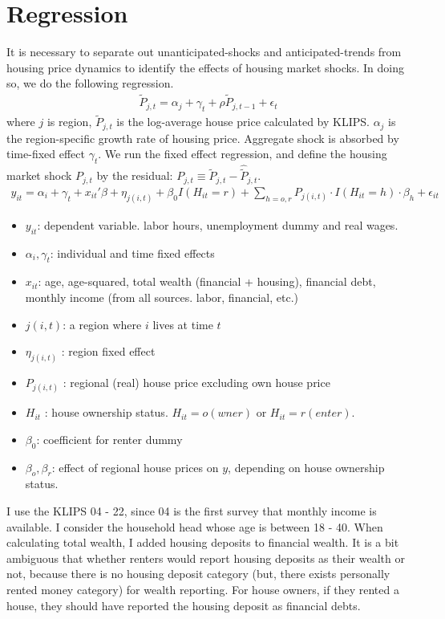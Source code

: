 \documentclass[12pt,letterpaper]{article}
\begin{document}
\section{Regression}
It is necessary to separate out unanticipated-shocks and anticipated-trends from housing price dynamics to identify the effects of housing market shocks. In doing so, we do the following regression.
\begin{eqnarray}
\tilde P_{j,t} = \alpha_j + \gamma_t + \rho \tilde P_{j,t-1} + \epsilon_t
\end{eqnarray}
where $j$ is region, $\tilde P_{j,t}$ is the log-average house price calculated by KLIPS. $\alpha_j$ is the region-specific growth rate of housing price. Aggregate shock is absorbed by time-fixed effect $\gamma_t$. We run the fixed effect regression, and define the housing market shock $P_{j,t}$ by the residual: $P_{j,t} \equiv \tilde P_{j,t} - \hat{\tilde P}_{j,t}$. 
\begin{eqnarray}
y_{it} = \alpha_i + \gamma_t + x_{it}'\beta + \eta_{j(i,t)} +\beta_0 I(H_{it} = r) + \sum_{h=o,r} P_{j(i,t)}\cdot I(H_{it} = h)\cdot\beta_{h} + \epsilon_{it}
\end{eqnarray}
\begin{itemize}
	\item $y_{it}$: dependent variable. labor hours, unemployment dummy and real wages.
	\item $\alpha_i,\gamma_t$: individual and time fixed effects			\item $x_{it}$: age, age-squared, total wealth (financial + housing), financial debt, monthly income (from all sources. labor, financial, etc.)
	\item $j(i,t)$: a region where $i$ lives at time $t$
	\item $\eta_{j(i,t)}$ : region fixed effect
	\item $P_{j(i,t)}$ : regional (real) house price excluding own house price
	\item $H_{it}$ : house ownership status. $H_{it} = o(wner)$ or $H_{it}=r(enter)$.
	\item $\beta_0$: coefficient for renter dummy
	\item $\beta_o,\beta_r$: effect of regional house prices on $y$, depending on house ownership status.
\end{itemize}
I use the KLIPS 04 - 22, since 04 is the first survey that monthly income is available. I consider the household head whose age is between 18 - 40. When calculating total wealth, I added housing deposits to financial wealth. It is a bit ambiguous that whether renters would report housing deposits as their wealth or not, because there is no housing deposit category (but, there exists personally rented money category) for wealth reporting. For house owners, if they rented a house, they should have reported the housing deposit as financial debts.
\newpage
\end{document}
